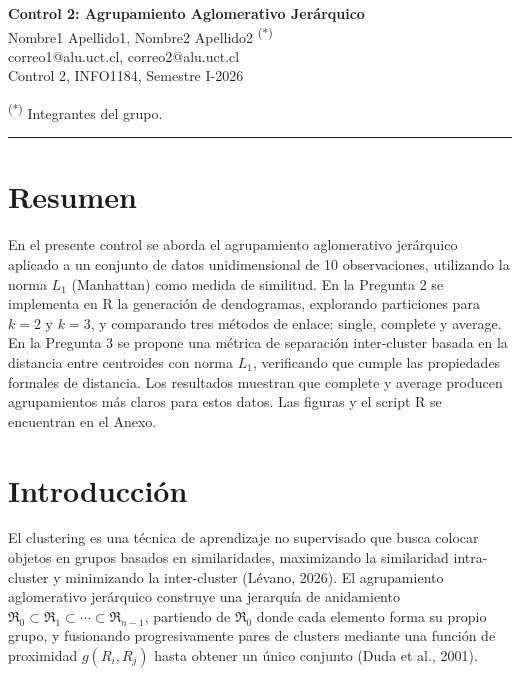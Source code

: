 \documentclass[10pt,a4paper]{article}
\begin{document}
\begin{center}
{\large \textbf{Control 2: Agrupamiento Aglomerativo Jerárquico}}\\[4pt]
Nombre1 Apellido1, Nombre2 Apellido2 \textsuperscript{(*)}\\[2pt]
{\small correo1@alu.uct.cl, correo2@alu.uct.cl}\\[2pt]
{\small Control 2, INFO1184, Semestre I-2026}
\end{center}
\noindent\textsuperscript{(*)} Integrantes del grupo.
\vspace{2pt}
\noindent\rule{\textwidth}{0.4pt}

\section*{Resumen}

En el presente control se aborda el agrupamiento aglomerativo jerárquico aplicado a un conjunto de datos unidimensional de 10 observaciones, utilizando la norma $L_1$ (Manhattan) como medida de similitud. En la Pregunta 2 se implementa en R la generación de dendogramas, explorando particiones para $k=2$ y $k=3$, y comparando tres métodos de enlace: single, complete y average. En la Pregunta 3 se propone una métrica de separación inter-cluster basada en la distancia entre centroides con norma $L_1$, verificando que cumple las propiedades formales de distancia. Los resultados muestran que complete y average producen agrupamientos más claros para estos datos. Las figuras y el script R se encuentran en el Anexo.

\section{Introducción}

El clustering es una técnica de aprendizaje no supervisado que busca colocar objetos en grupos basados en similaridades, maximizando la similaridad intra-cluster y minimizando la inter-cluster (Lévano, 2026). El agrupamiento aglomerativo jerárquico construye una jerarquía de anidamiento $\Re_0 \subset \Re_1 \subset \cdots \subset \Re_{n-1}$, partiendo de $\Re_0$ donde cada elemento forma su propio grupo, y fusionando progresivamente pares de clusters mediante una función de proximidad $g(R_i, R_j)$ hasta obtener un único conjunto (Duda et al., 2001).
\end{document}
